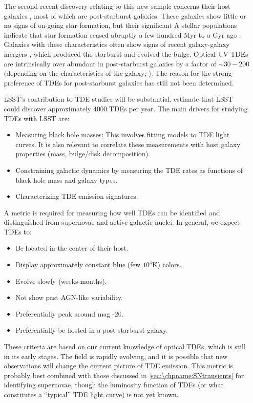 The second recent discovery relating to this new sample concerns their
host galaxies \citep{Arcavi2014, French2016}, most of which are
post-starburst galaxies. These galaxies show little or no signs of on-going star formation, but their significant A stellar populations indicate that star formation ceased abruptly a few hundred Myr to a Gyr ago \citep{Dressler1983}. Galaxies with these characteristics often show signs of recent galaxy-galaxy mergers \citep{Zabludoff1996}, which produced the starburst and evolved the bulge. Optical-UV TDEs are intrinsically over abundant in post-starburst galaxies by a factor of $\sim30-200$ (depending on the characteristics of the galaxy; \citealt{French2016}). The reason for the strong preference of TDEs for post-starburst galaxies has still not been determined.

LSST's contribution to TDE studies will be substantial.
\citet{VanVelzen2011} estimate that LSST could discover approximately
4000 TDEs per year. The main drivers for studying TDEs with LSST are:
\begin{itemize}
\item Measuring black hole masses: This involves fitting models to TDE
light curves. It is also relevant to correlate these measurements with
host galaxy properties (mass, bulge/disk decomposition).
\item Constraining galactic dynamics by measuring the TDE rates as
functions of black hole mass and galaxy types.
\item Characterizing TDE emission signatures.
\end{itemize}

A metric is required for measuring how well TDEs can be identified and
distinguished from supernovae and active galactic nuclei. In general, we
expect TDEs to:
\begin{itemize}
\item Be located in the center of their host.
\item Display approximately constant blue (few $10^4$K) colors.
\item Evolve slowly (weeks-months).
\item Not show past AGN-like variability.
\item Preferentially peak around mag -20.
\item Preferentially be hosted in a post-starburst galaxy.
\end{itemize}
These criteria are based on our current knowledge of optical TDEs, which
is still in its early stages. The field is rapidly evolving, and it is
possible that new observations will change the current picture of TDE
emission. This metric is probably best combined with those discussed in
 \autoref{sec:\chpname:SNtransients} for identifying supernovae, though the
luminosity function of TDEs (or what constitutes a ``typical'' TDE light
curve) is not yet known.

